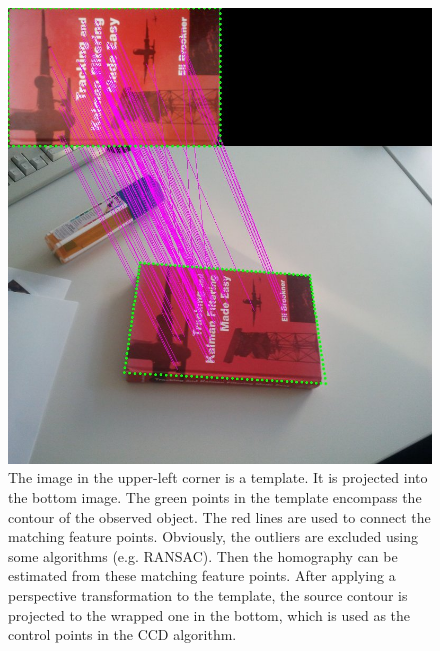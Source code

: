 \begin{figure}[htbp]
  \centering
\includegraphics[width=\linewidth]{images/sift.jpg}
\caption[Contour initialization using the SIFT algorithm]{The image in
  the upper-left corner is a template. It is projected into the bottom
  image. The green points in the template encompass the
  contour of the observed object. The red lines are used to connect the matching feature
  points. Obviously, the outliers are excluded using some algorithms
  (e.g. RANSAC). Then the homography can be estimated from these matching
  feature points.  After applying a perspective
  transformation to the template, the source contour is projected to
  the wrapped one in the bottom, which is used as the control points
  in the CCD algorithm.
  }
\label{fig:sift}
\end{figure}

